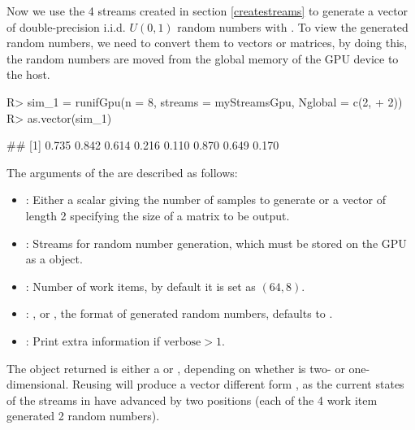 \documentclass[article,nojss]{jss}\usepackage[]{graphicx}\usepackage[]{color}
\newcommand{\fct}[1]{\code{#1()}}
\begin{document}
Now we use the 4 streams created in section \ref{createstreams} to generate a vector of double-precision i.i.d. $U(0,1)$ random numbers with \fct{runifGpu}. To view the generated random numbers, we need to convert them to  vectors or matrices, by doing this, the random numbers are moved from the global memory of the GPU device to the host.
\begin{CodeChunk}
\begin{CodeInput}
R> sim_1 = runifGpu(n = 8, streams = myStreamsGpu, Nglobal = c(2,
+    2))
R> as.vector(sim_1)
\end{CodeInput}
\begin{CodeOutput}
## [1] 0.735 0.842 0.614 0.216 0.110 0.870 0.649 0.170
\end{CodeOutput} 
\end{CodeChunk} 

The arguments of the \fct{runifGpu} are described as follows:
\begin{itemize}
\itemsep0em 
  \item {}: Either a scalar giving the number of samples to generate or a vector of length 2 specifying the size of a matrix to be output.
  \item {}: Streams for random number generation, which must be stored on the GPU as a  object.
  \item {}: Number of work items, by default it is set as $(64,8)$.
  \item {}: ,  or , the format of generated random numbers, defaults to .
  \item {}: Print extra information if $\text{verbose} > 1$.
\end{itemize}

The object returned is either a  or , depending on whether  is two- or one-dimensional.  Reusing  will produce a vector different form , as the current states of the streams in  have advanced by two positions (each of the 4 work item generated 2 random numbers).  
\end{document}
